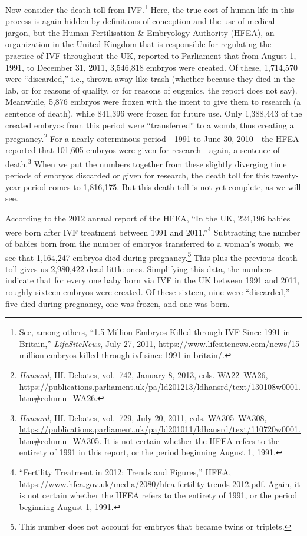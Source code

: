 \documentclass[
]{book}
\begin{document}
Now consider the death toll from IVF.\footnote{See, among others, ``1.5 Million Embryos Killed through IVF Since 1991 in Britain,'' \emph{LifeSiteNews}, July 27, 2011, \url{https://www.lifesitenews.com/news/15-million-embryos-killed-through-ivf-since-1991-in-britain/}.} Here, the true cost of human life in this process is again hidden by definitions of conception and the use of medical jargon, but the Human Fertilisation \& Embryology Authority (HFEA), an organization in the United Kingdom that is responsible for regulating the practice of IVF throughout the UK, reported to Parliament that from August 1, 1991, to December 31, 2011, 3,546,818 embryos were created. Of these, 1,714,570 were ``discarded,'' i.e., thrown away like trash (whether because they died in the lab, or for reasons of quality, or for reasons of eugenics, the report does not say). Meanwhile, 5,876 embryos were frozen with the intent to give them to research (a sentence of death), while 841,396 were frozen for future use. Only 1,388,443 of the created embryos from this period were ``transferred'' to a womb, thus creating a pregnancy.\footnote{\emph{Hansard}, HL Debates, vol.~742, January 8, 2013, cols. WA22--WA26, \url{https://publications.parliament.uk/pa/ld201213/ldhansrd/text/130108w0001.htm\#column_WA26}.} For a nearly coterminous period---1991 to June 30, 2010---the HFEA reported that 101,605 embryos were given for research---again, a sentence of death.\footnote{\emph{Hansard}, HL Debates, vol.~729, July 20, 2011, cols. WA305--WA308, \url{https://publications.parliament.uk/pa/ld201011/ldhansrd/text/110720w0001.htm\#column_WA305}. It is not certain whether the HFEA refers to the entirety of 1991 in this report, or the period beginning August 1, 1991.} When we put the numbers together from these slightly diverging time periods of embryos discarded or given for research, the death toll for this twenty-year period comes to 1,816,175. But this death toll is not yet complete, as we will see.

According to the 2012 annual report of the HFEA, ``In the UK, 224,196 babies were born after IVF treatment between 1991 and 2011.''\footnote{``Fertility Treatment in 2012: Trends and Figures,'' HFEA, \url{https://www.hfea.gov.uk/media/2080/hfea-fertility-trends-2012.pdf}. Again, it is not certain whether the HFEA refers to the entirety of 1991, or the period beginning August 1, 1991.} Subtracting the number of babies born from the number of embryos transferred to a woman's womb, we see that 1,164,247 embryos died during pregnancy.\footnote{This number does not account for embryos that became twins or triplets.} This plus the previous death toll gives us 2,980,422 dead little ones. Simplifying this data, the numbers indicate that for every one baby born via IVF in the UK between 1991 and 2011, roughly sixteen embryos were created. Of these sixteen, nine were ``discarded,'' five died during pregnancy, one was frozen, and one was born.
\end{document}

